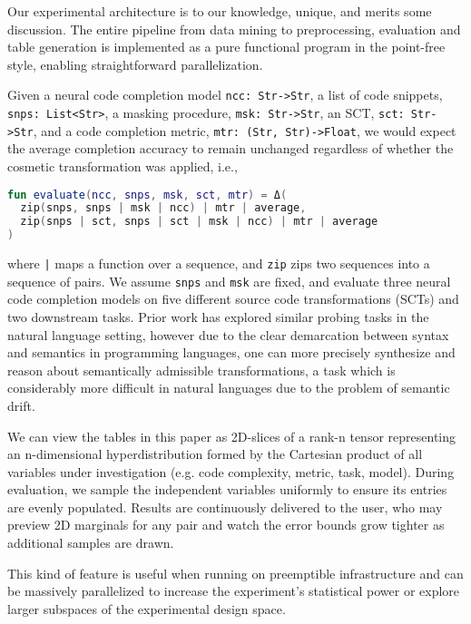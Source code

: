 \documentclass[sigconf,review,anonymous]{acmart}
\begin{document}
  Our experimental architecture is to our knowledge, unique, and merits some discussion. The entire pipeline from data mining to preprocessing, evaluation and table generation is implemented as a pure functional program in the point-free style, enabling straightforward parallelization.

  Given a neural code completion model \lstinline|ncc: Str->Str|, a list of code snippets, \lstinline|snps: List<Str>|, a masking procedure, \lstinline|msk: Str->Str|, an SCT, \lstinline|sct: Str->Str|, and a code completion metric, \lstinline|mtr: (Str, Str)->Float|, we would expect the average completion accuracy to remain unchanged regardless of whether the cosmetic transformation was applied, i.e.,

  \noindent\begin{lstlisting}[basicstyle=\footnotesize\ttfamily, language=kotlin,label={lst:lstlisting}]
fun evaluate(ncc, snps, msk, sct, mtr) = Δ(
  zip(snps, snps | msk | ncc) | mtr | average,
  zip(snps | sct, snps | sct | msk | ncc) | mtr | average
)
  \end{lstlisting}

  \noindent where \texttt{|} maps a function over a sequence, and \lstinline|zip| zips two sequences into a sequence of pairs. We assume \lstinline|snps| and \lstinline|msk| are fixed, and evaluate three neural code completion models on five different source code transformations (SCTs) and two downstream tasks. Prior work has explored similar probing tasks in the natural language setting, however due to the clear demarcation between syntax and semantics in programming languages, one can more precisely synthesize and reason about semantically admissible transformations, a task which is considerably more difficult in natural languages due to the problem of semantic drift.


  We can view the tables in this paper as 2D-slices of a rank-n tensor representing an n-dimensional hyperdistribution formed by the Cartesian product of all variables under investigation (e.g. code complexity, metric, task, model). During evaluation, we sample the independent variables uniformly to ensure its entries are evenly populated. Results are continuously delivered to the user, who may preview 2D marginals for any pair and watch the error bounds grow tighter as additional samples are drawn.

  This kind of feature is useful when running on preemptible infrastructure and can be massively parallelized to increase the experiment's statistical power or explore larger subspaces of the experimental design space.
\end{document}
